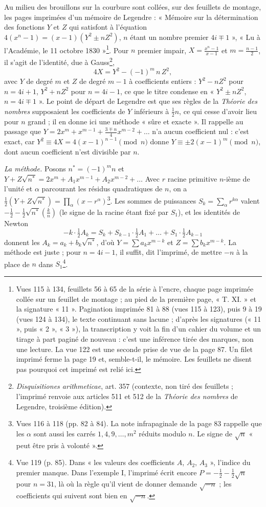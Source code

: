 \documentclass[11pt,a4paper]{article}
\begin{document}
Au milieu des brouillons sur la courbure sont collées, sur des feuillets de montage, les pages imprimées d'un mémoire de Legendre : « Mémoire sur la détermination des fonctions $Y$ et $Z$ qui satisfont à l'équation $4(x^n-1)=(x-1)(Y^2\pm nZ^2)$, $n$ étant un nombre premier $4i\mp1$ », « Lu à l'Académie, le 11 octobre 1830 »\footnote{Vues 115 à 134, feuillets 56 à 65 de la série à l'encre, chaque page imprimée collée sur un feuillet de montage ; au pied de la première page, « T. XI. » et la signature « 11 ». Pagination imprimée 81 à 88 (vues 115 à 123), puis 9 à 19 (vues 124 à 134), le texte continuant sans lacune ; d'après les signatures (« 11 », puis « 2 », « 3 »), la transcription y voit la fin d'un cahier du volume et un tirage à part paginé de nouveau : c'est une inférence tirée des marques, non une lecture. La vue 122 est une seconde prise de vue de la page 87. Un filet imprimé ferme la page 19 et, semble-t-il, le mémoire. Les feuillets ne disent pas pourquoi cet imprimé est relié ici.}. Pour $n$ premier impair, $X=\frac{x^n-1}{x-1}$ et $m=\frac{n-1}{2}$, il s'agit de l'identité, due à Gauss\footnote{\emph{Disquisitiones arithmeticae}, art. 357 (contexte, non tiré des feuillets ; l'imprimé renvoie aux articles 511 et 512 de la \emph{Théorie des nombres} de Legendre, troisième édition).},
\[ 4X=Y^2-(-1)^{m}\,n\,Z^2, \]
avec $Y$ de degré $m$ et $Z$ de degré $m-1$ à coefficients entiers : $Y^2-nZ^2$ pour $n=4i+1$, $Y^2+nZ^2$ pour $n=4i-1$, ce que le titre condense en « $Y^2\pm nZ^2$, $n=4i\mp1$ ». Le point de départ de Legendre est que ses règles de la \emph{Théorie des nombres} supposaient les coefficients de $Y$ inférieurs à $\frac12 n$, ce qui cesse d'avoir lieu pour $n$ grand ; il en donne ici une méthode « sûre et exacte ». Il rappelle au passage que $Y=2x^m+x^{m-1}+\frac{3\mp n}{4}x^{m-2}+\dots$ n'a aucun coefficient nul : c'est exact, car $Y^2\equiv 4X=4(x-1)^{n-1}\pmod n$ donne $Y\equiv\pm2(x-1)^m\pmod n$, dont aucun coefficient n'est divisible par $n$.

\emph{La méthode.} Posons $n^*=(-1)^m n$ et $Y+Z\sqrt{n^*}=2x^m+A_1x^{m-1}+A_2x^{m-2}+\dots$ Avec $r$ racine primitive $n$-ième de l'unité et $\alpha$ parcourant les résidus quadratiques de $n$, on a $\frac12(Y+Z\sqrt{n^*})=\prod_\alpha(x-r^\alpha)$\footnote{Vues 116 à 118 (pp. 82 à 84). La note infrapaginale de la page 83 rappelle que les $\alpha$ sont aussi les carrés $1,4,9,\dots,m^2$ réduits modulo $n$. Le signe de $\sqrt n$ « peut être pris à volonté ».}. Les sommes de puissances $S_k=\sum_\alpha r^{k\alpha}$ valent $-\frac12-\frac12\sqrt{n^*}\left(\frac{k}{n}\right)$ (le signe de la racine étant fixé par $S_1$), et les identités de Newton
\[ -k\cdot\tfrac12A_k=S_k+S_{k-1}\cdot\tfrac12A_1+\dots+S_1\cdot\tfrac12A_{k-1} \]
donnent les $A_k=a_k+b_k\sqrt{n^*}$, d'où $Y=\sum a_kx^{m-k}$ et $Z=\sum b_kx^{m-k}$. La méthode est juste ; pour $n=4i-1$, il suffit, dit l'imprimé, de mettre $-n$ à la place de $n$ dans $S_1$\footnote{Vue 119 (p. 85). Dans « les valeurs des coefficients $A$, $A_2$, $A_3$ », l'indice du premier manque. Dans l'exemple I, l'imprimé écrit encore $P=-\frac12-\frac12\sqrt n$ pour $n=31$, là où la règle qu'il vient de donner demande $\sqrt{-n}$ ; les coefficients qui suivent sont bien en $\sqrt{-n}$.}.
\end{document}
